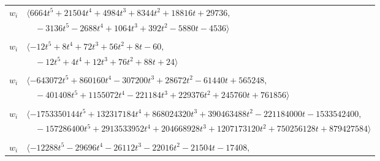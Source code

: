 \documentclass[11pt]{article}
\begin{document}
\begin{longtable}{@{}ll@{}}
$w_i$ & $\langle 6664t^{5}+21504t^{4}+4984t^{3}+8344t^{2}+18816t+29736,$\\
 & $\quad -3136t^{5}-2688t^{4}+1064t^{3}+392t^{2}-5880t-4536\rangle$\\
\addlinespace[2pt]
\multicolumn{2}{@{}p{0.97\textwidth}@{}}{$i=38$, $D_i=4$, $\rho_{ij}$: $0{:}1, \allowbreak 1{:}2, \allowbreak 4{:}1, \allowbreak 12{:}1, \allowbreak 13{:}2, \allowbreak 16{:}1, \allowbreak 17{:}1, \allowbreak 23{:}2, \allowbreak 35{:}1, \allowbreak 47{:}1, \allowbreak 51{:}1, \allowbreak 61{:}1, \allowbreak 65{:}1$}\\
$w_i$ & $\langle -12t^{5}+8t^{4}+72t^{3}+56t^{2}+8t-60,$\\
 & $\quad -12t^{5}+4t^{4}+12t^{3}+76t^{2}+88t+24\rangle$\\
\addlinespace[2pt]
\multicolumn{2}{@{}p{0.97\textwidth}@{}}{$i=39$, $D_i=2048$, $\rho_{ij}$: $2{:}2, \allowbreak 3{:}2, \allowbreak 16{:}1, \allowbreak 20{:}1, \allowbreak 23{:}2, \allowbreak 24{:}2, \allowbreak 27{:}1, \allowbreak 31{:}1, \allowbreak 32{:}1, \allowbreak 36{:}2, \allowbreak 40{:}1, \allowbreak 41{:}1, \allowbreak 47{:}1, \allowbreak 50{:}1$}\\
$w_i$ & $\langle -643072t^{5}+860160t^{4}-307200t^{3}+28672t^{2}-61440t+565248,$\\
 & $\quad -401408t^{5}+1155072t^{4}-221184t^{3}+229376t^{2}+245760t+761856\rangle$\\
\addlinespace[2pt]
\multicolumn{2}{@{}p{0.97\textwidth}@{}}{$i=40$, $D_i=65536$, $\rho_{ij}$: $0{:}1, \allowbreak 11{:}2, \allowbreak 16{:}2, \allowbreak 22{:}1, \allowbreak 24{:}1, \allowbreak 26{:}1, \allowbreak 28{:}2, \allowbreak 30{:}2, \allowbreak 33{:}2, \allowbreak 36{:}2, \allowbreak 39{:}2, \allowbreak 49{:}2, \allowbreak 51{:}2, \allowbreak 54{:}2, \allowbreak 63{:}1, \allowbreak 65{:}1$}\\
$w_i$ & $\langle -1753350144t^{5}+132317184t^{4}+868024320t^{3}+390463488t^{2}-221184000t-1533542400,$\\
 & $\quad -157286400t^{5}+2913533952t^{4}+204668928t^{3}+1207173120t^{2}+750256128t+879427584\rangle$\\
\addlinespace[2pt]
\multicolumn{2}{@{}p{0.97\textwidth}@{}}{$i=41$, $D_i=512$, $\rho_{ij}$: $3{:}1, \allowbreak 15{:}2, \allowbreak 20{:}2, \allowbreak 22{:}1, \allowbreak 24{:}1, \allowbreak 32{:}2, \allowbreak 37{:}1, \allowbreak 39{:}2, \allowbreak 67{:}1, \allowbreak 68{:}2$}\\
$w_i$ & $\langle -12288t^{5}-29696t^{4}-26112t^{3}-22016t^{2}-21504t-17408,$\\

\end{longtable}
\end{document}
